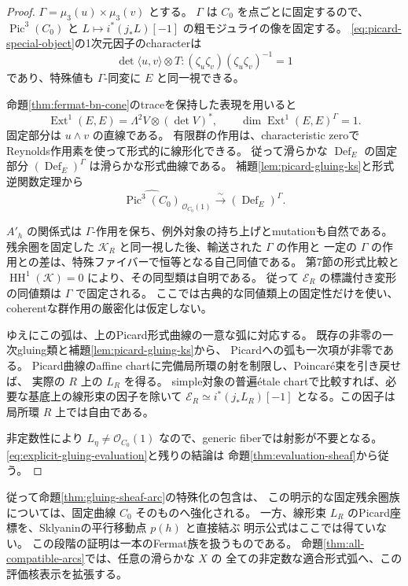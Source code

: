 \documentclass[a4paper,11pt]{ltjsarticle}
\theoremstyle{definition}
\newcommand{\OO}{\mathcal O}
\newcommand{\HH}{\operatorname{HH}}
\newcommand{\Def}{\operatorname{Def}}
\newcommand{\Ext}{\operatorname{Ext}}
\newcommand{\Pic}{\operatorname{Pic}}
\begin{document}
\begin{proof}
$\Gamma=\mu_3(u)\times\mu_3(v)$ とする。
$\Gamma$ は $C_0$ を点ごとに固定するので、$\Pic^3(C_0)$ と
$L\mapsto i^*(j_*L)[-1]$ の粗モジュライの像を固定する。
\eqref{eq:picard-special-object}の1次元因子のcharacterは
\[
 \det\langle u,v\rangle\otimes T:
 (\zeta_u\zeta_v)(\zeta_u\zeta_v)^{-1}=1
\]
であり、特殊値も $\Gamma$-同変に $E$ と同一視できる。

命題\ref{thm:fermat-bn-cone}のtraceを保持した表現を用いると
\[
 \Ext^1(E,E)=\Lambda^2V\otimes(\det V)^*,\qquad
 \dim\Ext^1(E,E)^\Gamma=1.
\]
固定部分は $u\wedge v$ の直線である。
有限群の作用は、characteristic zeroでReynolds作用素を使って形式的に線形化できる。
従って滑らかな $\Def_E$ の固定部分 $(\Def_E)^\Gamma$ は滑らかな形式曲線である。
補題\ref{lem:picard-gluing-ks}と形式逆関数定理から
\[
 \widehat{\Pic^3(C_0)}_{\,\OO_{C_0}(1)}
       \xrightarrow{\sim}(\Def_E)^\Gamma.
\]

$A'_h$ の関係式は $\Gamma$-作用を保ち、例外対象の持ち上げとmutationも自然である。
残余圏を固定した $\mathcal K_R$ と同一視した後、輸送された $\Gamma$ の作用と
一定の $\Gamma$ の作用との差は、特殊ファイバーで恒等となる自己同値である。
第7節の形式比較と $\HH^1(\mathcal K)=0$ により、その同型類は自明である。
従って $\mathcal E_R$ の標識付き変形の同値類は $\Gamma$ で固定される。
ここでは古典的な同値類上の固定性だけを使い、coherentな群作用の厳密化は仮定しない。

ゆえにこの弧は、上のPicard形式曲線の一意な弧に対応する。
既存の非零の一次gluing類と補題\ref{lem:picard-gluing-ks}から、
Picardへの弧も一次項が非零である。
Picard曲線のaffine chartに完備局所環の射を制限し、Poincar\'e束を引き戻せば、
実際の $R$ 上の $L_R$ を得る。
simple対象の普遍\'etale chartで比較すれば、必要な基底上の線形束の因子を除いて
$\mathcal E_R\simeq i^*(j_*L_R)[-1]$ となる。この因子は局所環 $R$ 上では自由である。

非定数性により $L_\eta\ne\OO_{C_0}(1)$ なので、generic fiberでは射影が不要となる。
\eqref{eq:explicit-gluing-evaluation}と残りの結論は
命題\ref{thm:evaluation-sheaf}から従う。
\end{proof}

従って命題\ref{thm:gluing-sheaf-arc}の特殊化の包含は、
この明示的な固定残余圏族については、固定曲線 $C_0$ そのものへ強化される。
一方、線形束 $L_R$ のPicard座標を、Sklyaninの平行移動点 $p(h)$ と直接結ぶ
明示公式はここでは得ていない。
この段階の証明は一本のFermat族を扱うものである。
命題\ref{thm:all-compatible-arcs}では、任意の滑らかな $X$ の
全ての非定数な適合形式弧へ、この評価核表示を拡張する。
\end{document}
